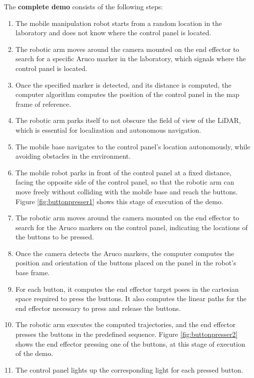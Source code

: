 The \textbf{complete demo} consists of the following steps:
\begin{enumerate}
    \item The mobile manipulation robot starts from a random location in the laboratory and does not know 
    where the control panel is located.
    \item The robotic arm moves around the camera mounted on the end effector to search for a specific Aruco marker 
    in the laboratory, which signals where the control panel is located.
    \item Once the specified marker is detected, and its distance is computed, the computer algorithm computes the
    position of the control panel in the map frame of reference.
    \item The robotic arm parks itself to not obscure the field of view of the LiDAR, which is essential for 
    localization and autonomous navigation.
    \item The mobile base navigates to the control panel's location autonomously, while avoiding obstacles in the
    environment.
    \item The mobile robot parks in front of the control panel at a fixed distance, facing the opposite side of the control panel,
    so that the robotic arm can move freely without colliding with the mobile base and reach the buttons.
    Figure \ref{fig:buttonpresser1} shows this stage of execution of the demo.
    \item The robotic arm moves around the camera mounted on the end effector to search for the Aruco markers
    on the control panel, indicating the locations of the buttons to be pressed.
    \item Once the camera detects the Aruco markers, the computer computes the position and orientation
    of the buttons placed on the panel in the robot's base frame.
    \item For each button, it computes the end effector target poses in the cartesian space required to press the buttons.
    It also computes the linear paths for the end effector necessary to press and release the buttons.
    \item The robotic arm executes the computed trajectories, and the end effector presses the buttons in the predefined sequence.
    Figure \ref{fig:buttonpresser2} shows the end effector pressing one of the buttons, at this stage of execution of the demo.
    \item The control panel lights up the corresponding light for each pressed button.
\end{enumerate}

